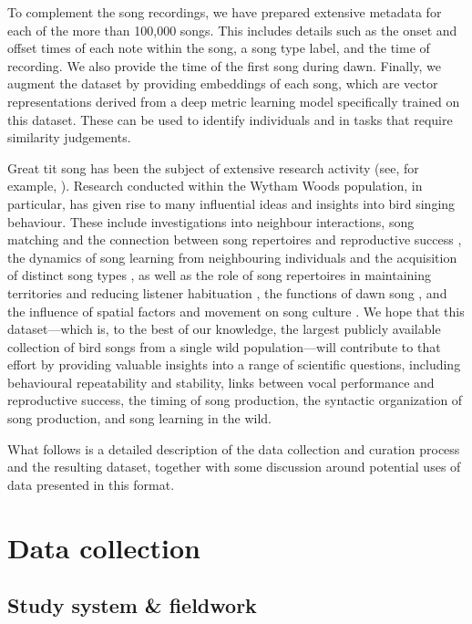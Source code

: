 To complement the song recordings, we have prepared extensive metadata for each of the more than 100,000 songs. This includes details such as the onset and offset times of each note within the song, a song type label, and the time of recording. We also provide the time of the first song during dawn. Finally, we augment the dataset by providing embeddings of each song, which are vector representations derived from a deep metric learning model specifically trained on this dataset. These can be used to identify individuals and in tasks that require similarity judgements.

Great tit song has been the subject of extensive research activity (see, for example, \cite{lambrechts1990, lind1996, rivera-gutierrez2010a, rivera-gutierrez2010, rivera-gutierrez2011, slagsvold1994, Ritschard2012}). Research conducted within the Wytham Woods population, in particular, has given rise to many influential ideas and insights into bird singing behaviour. These include investigations into neighbour interactions, song matching and the connection between song repertoires and reproductive success \parencite{mcgregor1981, mcgregor1983, mcgregor1989}, the dynamics of song learning from neighbouring individuals and the acquisition of distinct song types \parencite{mcgregor1989, mcgregor1982b}, as well as the role of song repertoires in maintaining territories and reducing listener habituation \parencite{krebs1976, krebs1978}, the functions of dawn song \parencite{kacelnik1983, mace1987}, and the influence of spatial factors and movement on song culture \parencite{fayet2014}. We hope that this dataset---which is, to the best of our knowledge, the largest publicly available collection of bird songs from a single wild population---will contribute to that effort by providing valuable insights into a range of scientific questions, including behavioural repeatability and stability, links between vocal performance and reproductive success, the timing of song production, the syntactic organization of song production, and song learning in the wild.

What follows is a detailed description of the data collection and curation process and the resulting dataset, together with some discussion around potential uses of data presented in this format.

\section{Data collection}
\subsection{Study system \& fieldwork}

